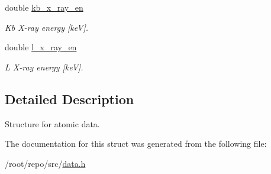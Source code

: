 \begin{DoxyCompactItemize}
double \hyperlink{structpyne_1_1atomic_aa93013778d65dc071c27564449e351de}{kb\+\_\+x\+\_\+ray\+\_\+en}
\begin{DoxyCompactList}\small\item\em Kb X-\/ray energy \mbox{[}keV\mbox{]}. \end{DoxyCompactList}\item 
\mbox{\label{structpyne_1_1atomic_a43e9e36e9b5bd8e4e77ffbe86b5ef28d}} 
double \hyperlink{structpyne_1_1atomic_a43e9e36e9b5bd8e4e77ffbe86b5ef28d}{l\+\_\+x\+\_\+ray\+\_\+en}
\begin{DoxyCompactList}\small\item\em L X-\/ray energy \mbox{[}keV\mbox{]}. \end{DoxyCompactList}\end{DoxyCompactItemize}


\subsection{Detailed Description}
Structure for atomic data. 

The documentation for this struct was generated from the following file\+:\begin{DoxyCompactItemize}
\item 
/root/repo/src/\hyperlink{data_8h}{data.\+h}\end{DoxyCompactItemize}
